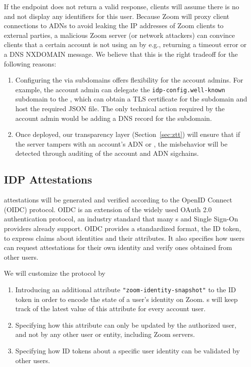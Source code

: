 If the endpoint does not return a valid response, clients will assume there is no \idp and not
display any identifiers for this user. Because Zoom will proxy client connections to ADNs to avoid
leaking the IP addresses of Zoom clients to external parties, a malicious Zoom server (or network
attackers) can convince clients that a certain account is not using an \idp by e.g., returning a
timeout error or a DNS NXDOMAIN message. We believe that this is the right tradeoff for the
following reasons:

\begin{enumerate}
\item Configuring the \idp via subdomains offers flexibility for the account admins. For example,
    the account admin can delegate the \texttt{idp-config.well-known} subdomain to the \idp, which
    can obtain a TLS certificate for the subdomain and host the required JSON file. The only
    technical action required by the account admin would be adding a DNS record for the subdomain.
\item Once deployed, our transparency layer (Section~\ref{sec:ztt}) will ensure that if the server
    tampers with an account's ADN or \idp, the misbehavior will be detected through auditing of the
    account and ADN sigchains.
\end{enumerate}

\subsection{IDP Attestations}

\idp attestations will be generated and verified according to the OpenID Connect (OIDC) protocol.
OIDC is an extension of the widely used OAuth 2.0 authentication protocol, an industry standard that
many {\idp}s and Single Sign-On providers already support. OIDC provides a standardized format, the
ID token, to express claims about identities and their attributes. It also specifies how users can
request attestations for their own identity and verify ones obtained from other users.

We will customize the protocol by

\begin{enumerate}
\item Introducing an additional attribute \texttt{"zoom-identity-snapshot"} to the ID token in order
    to encode the state of a user's identity on Zoom. {\idp}s will keep track of the latest value of
    this attribute for every account user.
\item Specifying how this attribute can only be updated by the authorized user, and not by any other
    user or entity, including Zoom servers.
\item Specifying how ID tokens about a specific user identity can be validated by other users.
\end{enumerate}

